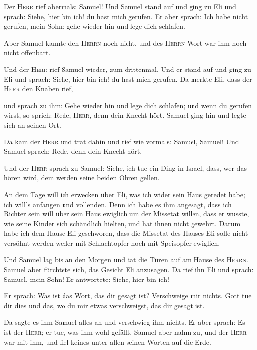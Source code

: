  Der \textsc{Herr} rief abermals: Samuel! Und Samuel stand
auf und ging zu Eli und sprach: Siehe, hier bin ich! du hast mich
gerufen. Er aber sprach: Ich habe nicht gerufen, mein Sohn; gehe wieder
hin und lege dich schlafen.

 Aber Samuel kannte den \textsc{Herrn} noch nicht, und des
\textsc{Herrn} Wort war ihm noch nicht offenbart.

 Und der \textsc{Herr} rief Samuel wieder, zum drittenmal.
Und er stand auf und ging zu Eli und sprach: Siehe, hier bin ich! du
hast mich gerufen. Da merkte Eli, dass der \textsc{Herr} den Knaben
rief,

 und sprach zu ihm: Gehe wieder hin und lege dich
schlafen; und wenn du gerufen wirst, so sprich: Rede, \textsc{Herr},
denn dein Knecht hört. Samuel ging hin und legte sich an seinen Ort.

 Da kam der \textsc{Herr} und trat dahin und rief wie
vormals: Samuel, Samuel! Und Samuel sprach: Rede, denn dein Knecht hört.

 Und der \textsc{Herr} sprach zu Samuel: Siehe, ich tue
ein Ding in Israel, dass, wer das hören wird, dem werden seine beiden
Ohren gellen.

 An dem Tage will ich erwecken über Eli, was ich wider
sein Haus geredet habe; ich will's anfangen und vollenden.
 Denn ich habe es ihm angesagt, dass ich Richter sein
will über sein Haus ewiglich um der Missetat willen, dass er wusste, wie
seine Kinder sich schändlich hielten, und hat ihnen nicht gewehrt.
 Darum habe ich dem Hause Eli geschworen, dass die
Missetat des Hauses Eli solle nicht versöhnt werden weder mit
Schlachtopfer noch mit Speisopfer ewiglich.

 Und Samuel lag bis an den Morgen und tat die Türen auf
am Hause des \textsc{Herrn}. Samuel aber fürchtete sich, das Gesicht Eli
anzusagen.  Da rief ihn Eli und sprach: Samuel, mein
Sohn! Er antwortete: Siehe, hier bin ich!

 Er sprach: Was ist das Wort, das dir gesagt ist?
Verschweige mir nichts. Gott tue dir dies und das, wo du mir etwas
verschweigst, das dir gesagt ist.

 Da sagte es ihm Samuel alles an und verschwieg ihm
nichts. Er aber sprach: Es ist der \textsc{Herr}; er tue, was ihm wohl
gefällt.  Samuel aber nahm zu, und der \textsc{Herr} war
mit ihm, und fiel keines unter allen seinen Worten auf die Erde.

